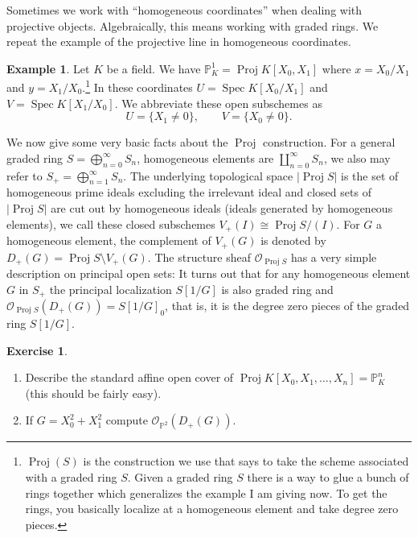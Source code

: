 \documentclass[12pt]{article}
\numberwithin{equation}{section}
\theoremstyle{definition}
\newtheorem{example}[theorem]{Example}
\newtheorem{exercise}[theorem]{Exercise}
\theoremstyle{remark}
\newcommand{\Ocal}{\mathcal{O}}
\newcommand{\PP}{\mathbb{P}}
\newcommand{\Spec}{\operatorname{Spec}}
\newcommand{\Proj}{\operatorname{Proj}}
\begin{document}
	Sometimes we work with ``homogeneous coordinates'' when dealing with projective objects. 
	Algebraically, this means working with graded rings.  
	We repeat the example of the projective line in homogeneous coordinates.
\begin{example}
	Let $K$ be a field. 
	We have $\PP^1_K = \Proj K[X_0,X_1]$ where $x = X_0/X_1$ and $y = X_1/X_0$.\footnote{$\Proj(S)$ is the construction we use that says to take the scheme associated with a graded ring $S$. Given a graded ring $S$ there is a way to glue a bunch of rings together which generalizes the example I am giving now. To get the rings, you basically localize at a homogeneous element and take degree zero pieces. }
	In these coordinates $U= \Spec K[X_0/X_1]$ and $V = \Spec K[X_1/X_0]$.
	We abbreviate these open subschemes as 
	 $$ U = \lbrace X_1 \neq 0 \rbrace, \qquad V = \lbrace X_0\neq 0 \rbrace. $$
\end{example}

We now give some very basic facts about the $\Proj$ construction. 
For a general graded ring $S = \bigoplus_{n=0}^{\infty} S_n$, homogeneous elements are $\coprod_{n=0}^{\infty} S_n$, we also may refer to $S_+ = \bigoplus_{n=1}^{\infty} S_n$.
The underlying topological space $\vert \Proj S\vert$ is the set of homogeneous prime ideals excluding the irrelevant ideal and closed sets of $\vert \Proj S \vert$ are cut out by homogeneous ideals (ideals generated by homogeneous elements), we call these closed subschemes $V_+(I) \cong \Proj S/(I)$.
For $G$ a homogeneous element, the complement of $V_+(G)$ is denoted by 
 $D_+(G) = \Proj S \setminus V_+(G)$. 
The structure sheaf $\Ocal_{\Proj S}$ has a very simple description on principal open sets:
It turns out that for any homogeneous element $G$ in $S_+$ the principal localization $S[1/G]$ is also graded ring and $\Ocal_{\Proj S}(D_+(G)) = S[1/G]_0$, that is, it is the degree zero pieces of the graded ring $S[1/G]$.

\begin{exercise}
	\begin{enumerate}
		\item Describe the standard affine open cover of $\Proj K[X_0,X_1,\ldots, X_n] = \PP^n_K$ (this should be fairly easy).
		\item If $G = X_0^2+X_1^2$ compute $\Ocal_{\PP^2}(D_+(G))$.
	\end{enumerate}
\end{exercise}
\end{document}
